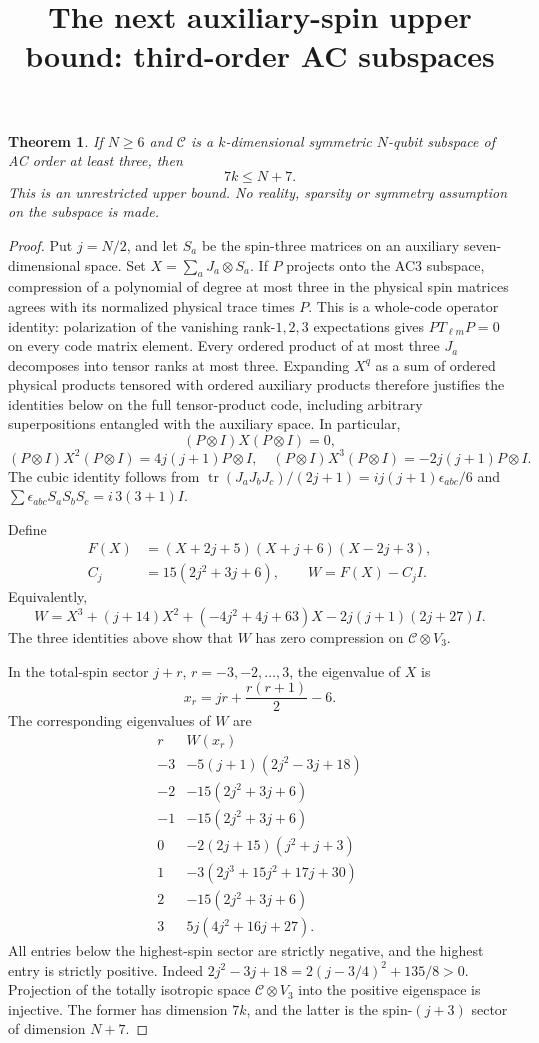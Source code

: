 \documentclass[11pt]{article}
\newtheorem{theorem}{Theorem}
\begin{document}
\title{The next auxiliary-spin upper bound: third-order AC subspaces}
\author{}\date{}\maketitle
\begin{theorem}
If $N\ge6$ and $\mathcal C$ is a $k$-dimensional symmetric $N$-qubit
subspace of AC order at least three, then
\[
 \boxed{7k\le N+7.}
\]
This is an unrestricted upper bound. No reality, sparsity or symmetry
assumption on the subspace is made.
\end{theorem}
\begin{proof}
Put $j=N/2$, and let $S_a$ be the spin-three matrices on an auxiliary
seven-dimensional space. Set $X=\sum_aJ_a\otimes S_a$. If $P$ projects
onto the AC3 subspace, compression of a polynomial of degree at most
three in the physical spin matrices agrees with its normalized physical
trace times $P$.
This is a whole-code operator identity: polarization of the vanishing
rank-$1,2,3$ expectations gives $PT_{\ell m}P=0$ on every code
matrix element. Every ordered product of at most three $J_a$ decomposes
into tensor ranks at most three. Expanding $X^q$ as a sum of ordered
physical products tensored with ordered auxiliary products therefore
justifies the identities below on the full tensor-product code, including
arbitrary superpositions entangled with the auxiliary space. In particular,
\[
 (P\otimes I)X(P\otimes I)=0,
\]
\[
 (P\otimes I)X^2(P\otimes I)=4j(j+1)P\otimes I,
 \quad
 (P\otimes I)X^3(P\otimes I)=-2j(j+1)P\otimes I.
\]
The cubic identity follows from
$\operatorname{tr}(J_aJ_bJ_c)/(2j+1)=ij(j+1)\epsilon_{abc}/6$
and $\sum\epsilon_{abc}S_aS_bS_c=i\,3(3+1)I$.

Define
\begin{align*}
 F(X)&=(X+2j+5)(X+j+6)(X-2j+3),\\
 C_j&=15(2j^2+3j+6),\qquad W=F(X)-C_jI.
\end{align*}
Equivalently,
\[
 W=X^3+(j+14)X^2+(-4j^2+4j+63)X
      -2j(j+1)(2j+27)I.
\]
The three identities above show that $W$ has zero compression on
$\mathcal C\otimes V_3$.

In the total-spin sector $j+r$, $r=-3,-2,\ldots,3$, the eigenvalue of $X$
is
\[
 x_r=jr+\frac{r(r+1)}2-6.
\]
The corresponding eigenvalues of $W$ are
\[
\begin{array}{c|c}
 r& W(x_r)\\\hline
 -3&-5(j+1)(2j^2-3j+18)\\
 -2&-15(2j^2+3j+6)\\
 -1&-15(2j^2+3j+6)\\
 0&-2(2j+15)(j^2+j+3)\\
 1&-3(2j^3+15j^2+17j+30)\\
 2&-15(2j^2+3j+6)\\
 3&5j(4j^2+16j+27).
\end{array}
\]
All entries below the highest-spin sector are strictly negative, and the
highest entry is strictly positive. Indeed
$2j^2-3j+18=2(j-3/4)^2+135/8>0$.
Projection of the totally isotropic space $\mathcal C\otimes V_3$ into
the positive eigenspace is injective. The former has dimension $7k$,
and the latter is the spin-$(j+3)$ sector of dimension $N+7$.
\end{proof}
\end{document}
